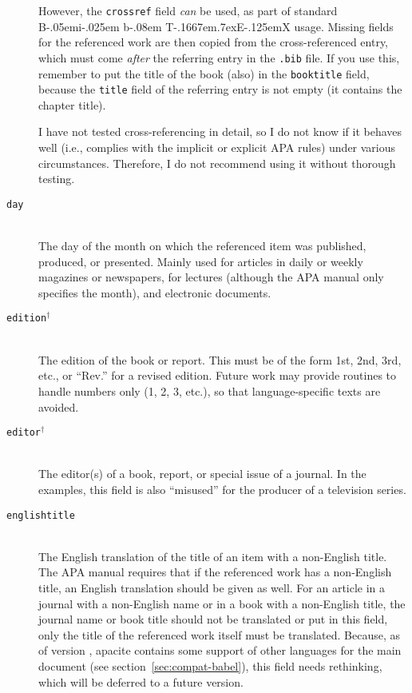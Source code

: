 \documentclass{article}
\def\BibTeX{{\rm B\kern-.05em{\sc i\kern-.025em b}\kern-.08em
    T\kern-.1667em\lower.7ex\hbox{E}\kern-.125emX}}%
\newcommand{\APACversiondate}[1]{\relax [#1]}
\newcommand{\LC}{\mbox{${}^{\dag}$}}%
\newcommand{\pkg}[1]{\textsf{#1}}%
\newcommand{\fname}[1]{\texttt{#1}}%
\newcommand{\fieldname}[1]{\texttt{#1}}%
\begin{document}
\begin{description}
       However, the \fieldname{crossref} field
       \emph{can} be used, as part of standard \BibTeX{} usage.
       Missing fields for the referenced work are then copied from
       the cross-referenced entry, which must come \emph{after}
       the referring entry in the \fname{.bib} file. If you use
       this, remember to put the title of the book (also) in the
       \fieldname{booktitle} field, because the \fieldname{title}
       field of the referring entry is not empty (it contains
       the chapter title).

       I have not tested cross-referencing in detail, so I do not
       know if it behaves well (i.e., complies with the implicit
       or explicit APA rules) under various circumstances.
       Therefore, I do not recommend using it without thorough
       testing.

    \item[\fieldname{day}] \mbox{}\\
       The day of the month on which the referenced item was published,
       produced, or presented. Mainly used for articles in daily or
       weekly magazines or newspapers, for lectures (although the
       APA manual only specifies the month), and electronic documents.

    \item[\fieldname{edition}\LC] \mbox{}\\
       The edition of the book or report. This must be of the form 1st, 2nd,
       3rd, etc., or ``Rev.'' for a revised edition. Future work may provide
       routines to handle numbers only (1, 2, 3, etc.), so that
       language-specific texts are avoided.

    \item[\fieldname{editor}\LC] \mbox{}\\
       The editor(s) of a book, report, or special issue of a journal.
       In the examples, this field is also ``misused'' for the
       producer of a television series.

    \item[\fieldname{englishtitle}] \mbox{}\\
       The English translation of the title of an item with a non-English
       title. The APA manual requires that if the referenced work has a
       non-English title, an English translation should be given as well. For
       an article in a journal with a non-English name or in a book with a
       non-English title, the journal name or book title should not be
       translated or put in this field, only the title of the referenced work
       itself must be translated. Because, as of version
       \APACversiondate{2005/06/01}, \pkg{apacite} contains some support of
       other languages for the main document (see
       section~\ref{sec:compat-babel}), this field needs rethinking, which
       will be deferred to a future version.


\end{description}
\end{document}
